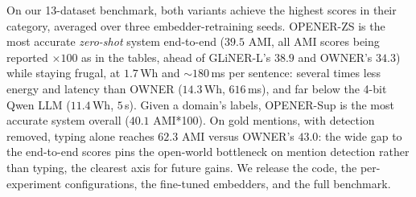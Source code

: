 On our 13-dataset benchmark, both variants achieve the highest scores in their category, averaged over three embedder-retraining seeds. OPENER-ZS is the most accurate \emph{zero-shot} system end-to-end ($39.5$ AMI, all AMI scores being reported $\times 100$ as in the tables, ahead of GLiNER-L's $38.9$ and OWNER's $34.3$) while staying frugal, at $1.7$\,Wh and $\sim$$180$\,ms per sentence: several times less energy and latency than OWNER ($14.3$\,Wh, $616$\,ms), and far below the 4-bit Qwen LLM ($11.4$\,Wh, $5$\,s). Given a domain's labels, OPENER-Sup is the most accurate system overall ($40.1$ AMI*100). On gold mentions, with detection removed, typing alone reaches $62.3$ AMI versus OWNER's $43.0$: the wide gap to the end-to-end scores pins the open-world bottleneck on mention detection rather than typing, the clearest axis for future gains.
We release the code, the per-experiment configurations, the fine-tuned embedders, and the full benchmark.
